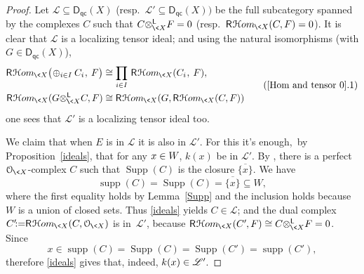 \documentclass{compositio}
\theoremstyle{plain}
\theoremstyle{definition}
\theoremstyle{remark}
\numberwithin{equation}{thm}
\begin{document}
\begin{proof}
Let ${\mathscr{L}}\subseteq{{\boldsymbol{\mathsf{D}}}_{\mathsf{qc}}}(X)$ (resp.~${\mathscr{L}}' \subseteq{{\boldsymbol{\mathsf{D}}}_{\mathsf{qc}}}(X))$ be the full subcategory spanned by the complexes $C$ such that $C{\otimes^{\mathsf L}_{{{\mkern-1mu}\<X}}}F=0$ (resp.~${\mathsf R}{\mkern1mu}{{\mathcal H} om}_{{{\mkern-1mu}\<X}}(C,F)=0$). It is clear that ${\mathscr{L}}$ is a localizing tensor ideal;{} and using the natural isomorphisms (with $G\in{{\boldsymbol{\mathsf{D}}}_{\mathsf{qc}}}(X)$),{}
\[
\begin{aligned}\label{eqnA3}
{\mathsf R}{\mkern1mu}{{\mathcal H} om}_{{{\mkern-1mu}\<X}}\big(\!\oplus_{i\in I}C_i{\mkern1mu},\>F\big)&\cong\prod_{i\in I}\,{\mathsf R}{\mkern1mu}{{\mathcal H} om}_{{{\mkern-1mu}\<X}}(C_i{\mkern1mu},\>F),\\
{\mathsf R}{\mkern1mu}{{\mathcal H} om}_{{{\mkern-1mu}\<X}}(G{\otimes^{\mathsf L}_{{{\mkern-1mu}\<X}}}C,F)&\cong{\mathsf R}{\mkern1mu}{{\mathcal H} om}_{{{\mkern-1mu}\<X}}(G,{\mathsf R}{\mkern1mu}{{\mathcal H} om}_{{{\mkern-1mu}\<X}}(C,F))\\[1pt]
\end{aligned}\tag{\ref{Hom and tensor 0}.1}
\]
\vskip-2pt\noindent
one sees that ${\mathscr{L}}'$ is a localizing tensor ideal too.

We claim that when $E$ is in ${\mathscr{L}}$ it is also in ${\mathscr{L}}'$. For this it's enough,~by Proposition~\ref{ideals}, that for any $x\in W{\mkern-1mu}$, $k(x)$ be in ${\mathscr{L}}'$.  By \cite[Lemma~3.4]{T},  there is a perfect ${\mathcal O_{{\mkern-1mu}\<X}}$-complex $C$ such that $\operatorname{Supp}(C)$ is the  closure $\overline{\{x\}}$. {}We have 
\[\operatorname{supp}(C)=\operatorname{Supp}(C)=\overline{\{x\}}\subseteq W, 
\]
where the first equality holds by Lemma~\ref{Supp} and the inclusion holds because $W$ is a union of closed sets. Thus \ref{ideals} yields $C\in{\mathscr{L}}$; and the dual complex $C'{\!:=}{\mathsf R}{\mkern1mu}{{\mathcal H} om}_{{{\mkern-1mu}\<X}}(C,{\mathcal O_{{\mkern-1mu}\<X}})$ is in~${\mathscr{L}}'$, because ${\mathsf R}{\mkern1mu}{{\mathcal H} om}_{{{\mkern-1mu}\<X}}(C'{\mkern-1mu},F)\cong C{\otimes^{\mathsf L}_{{{\mkern-1mu}\<X}}} F=0$. Since{}
\[
x\in\operatorname{supp}(C) =\operatorname{Supp}(C)=\operatorname{Supp}(C')=\operatorname{supp}(C'),
\]
\vskip-1pt\noindent
therefore \ref{ideals} gives that, indeed, $k(x)\in{\mathscr{L}}'{\mkern-1mu}$.
 

\end{proof}
\end{document}
